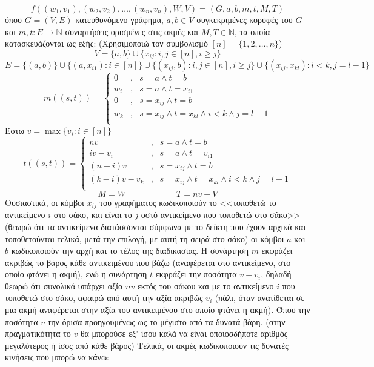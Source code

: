 \documentclass[12pt]{article}
\begin{document}
$$f((w_1,v_1),(w_2,v_2),\ldots,(w_n,v_n),W,V)=(G,a,b,m,t,Μ,Τ)$$
όπου $G=(V,E)$ κατευθυνόμενο γράφημα, $a,b\in V$ συγκεκριμένες κορυφές του $G$ και $m,t:E\to\mathbb{N}$ συναρτήσεις ορισμένες στις ακμές και $M,T\in\mathbb{N}$, τα οποία κατασκευάζονται ως εξής:
(Χρησιμοποιώ τον συμβολισμό $[n]=\{1,2,\ldots,n\}$)
$$V=\{a,b\}\cup\{x_{ij}:i,j\in[n],i\geq j\}$$
$$E=\{(a,b)\}\cup\{(a,x_{i1}):i\in[n]\}\cup\{(x_{ij},b):i,j\in[n],i\geq j\}\cup\{(x_{ij},x_{kl}):i<k,j=l-1\}$$
$$m((s,t))=\left\{\begin{array}{rcl}
0&,&s=a\land t=b\\
w_i&,&s=a\land t=x_{i1}\\
0&,&s=x_{ij}\land t=b\\
w_k&,&s=x_{ij}\land t=x_{kl}\land i<k\land j=l-1\\
\end{array}\right.$$
Έστω $v=\max\{v_i:i\in[n]\}$
$$t((s,t))=\left\{\begin{array}{rcl}
nv&,&s=a\land t=b\\
iv-v_i&,&s=a\land t=v_{i1}\\
(n-i)v&,&s=x_{ij}\land t=b\\
(k-i)v-v_k&,&s=x_{ij}\land t=x_{kl}\land i<k\land j=l-1\\
\end{array}\right.$$
$$M=W\qquad\qquad\qquad T=nv-V$$
Ουσιαστικά, οι κόμβοι $x_{ij}$ του γραφήματος κωδικοποιούν το <<τοποθετώ το αντικείμενο $i$ στο σάκο, και είναι το $j$-οστό αντικείμενο που τοποθετώ στο σάκο>> (θεωρώ ότι τα αντικείμενα διατάσσονται σύμφωνα με το δείκτη που έχουν αρχικά και τοποθετούνται τελικά, μετά την επιλογή, με αυτή τη σειρά στο σάκο) οι κόμβοι $a$ και $b$ κωδικοποιούν την αρχή και το τέλος της διαδικασίας. Η συνάρτηση $m$ εκφράζει ακριβώς το βάρος κάθε αντικειμένου που βάζω (αναφέρεται στο αντικείμενο, στο οποίο φτάνει η ακμή), ενώ η συνάρτηση $t$ εκφράζει την ποσότητα $v-v_i$, δηλαδή θεωρώ ότι συνολικά υπάρχει αξία $nv$ εκτός του σάκου και με το αντικείμενο $i$ που τοποθετώ στο σάκο, αφαιρώ από αυτή την αξία ακριβώς $v_i$ (πάλι, όταν ανατίθεται σε μια ακμή αναφέρεται στην αξία του αντικειμένου στο οποίο φτάνει η ακμή). Όπου την ποσότητα $v$ την όρισα προηγουμένως ως το μέγιστο από τα δυνατά βάρη. (στην πραγματικότητα το $v$ θα μπορούσε εξ' ίσου καλά να είναι οποιοσδήποτε αριθμός μεγαλύτερος ή ίσος από κάθε βάρος) Τελικά, οι ακμές κωδικοποιούν τις δυνατές κινήσεις που μπορώ να κάνω:
\end{document}
